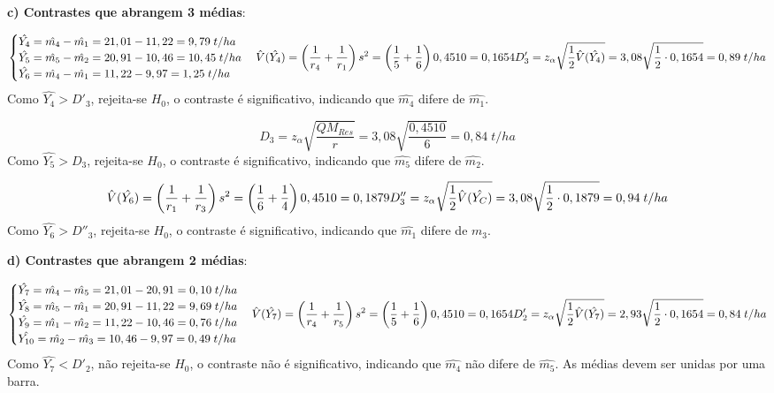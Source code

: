 \documentclass[
]{book}
\begin{document}
\textbf{c) Contrastes que abrangem 3 médias}:

\[
\begin{cases} \hat{Y_4}=\hat{m_4}-\hat{m_1} = 21,01-11,22 = 9,79\;t/ha \\
\hat{Y_5}=\hat{m_5}-\hat{m_2} = 20,91-10,46 = 10,45\;t/ha \\
\hat{Y_6}=\hat{m_4}-\hat{m_1} = 11,22-9,97 = 1,25\;t/ha \end{cases} \\
\hat{V}(\hat{Y_4})= \left( \frac{1}{r_4} + \frac{1}{r_1}\right)s^2 = \left( \frac{1}{5} + \frac{1}{6}\right)0,4510 = 0,1654\\
D'_3 = z_\alpha \sqrt{\frac{1}{2}\hat{V}(\hat{Y_4})}= 3,08\sqrt{\frac{1}{2}\cdot0,1654} = 0,89\; t/ha \\
\]
Como \(\hat{Y_4} > D'_3\), rejeita-se \(H_0\), o contraste é significativo, indicando que \(\hat{m_4}\) difere de \(\hat{m_1}\).

\[
D_3 = z_\alpha \sqrt{\frac{QM_{Res}}{r}} = 3,08 \sqrt{\frac{0,4510}{6}} = 0,84\; t/ha
\]
Como \(\hat{Y_5} > D_3\), rejeita-se \(H_0\), o contraste é significativo, indicando que \(\hat{m_5}\) difere de \(\hat{m_2}\).

\[
\hat{V}(\hat{Y_6})= \left( \frac{1}{r_1} + \frac{1}{r_3}\right)s^2 = \left( \frac{1}{6} + \frac{1}{4}\right)0,4510 = 0,1879\\
D''_3 = z_\alpha \sqrt{\frac{1}{2}\hat{V}(\hat{Y_C})}= 3,08\sqrt{\frac{1}{2}\cdot0,1879} = 0,94\; t/ha \\
\]
Como \(\hat{Y_6} > D''_3\), rejeita-se \(H_0\), o contraste é significativo, indicando que \(\hat{m_1}\) difere de \(\hat{m_3}\).

\textbf{d) Contrastes que abrangem 2 médias}:

\[
\begin{cases} 
\hat{Y_7}=\hat{m_4}-\hat{m_5} = 21,01-20,91 = 0,10\;t/ha \\
\hat{Y_8}=\hat{m_5}-\hat{m_1} = 20,91-11,22 = 9,69\;t/ha \\
\hat{Y_9}=\hat{m_1}-\hat{m_2} = 11,22-10,46 = 0,76\;t/ha \\
\hat{Y_{10}}=\hat{m_2}-\hat{m_3} = 10,46-9,97 = 0,49\;t/ha 
\end{cases} \\
\hat{V}(\hat{Y_7})= \left( \frac{1}{r_4} + \frac{1}{r_5}\right)s^2 = \left( \frac{1}{5} + \frac{1}{6}\right)0,4510 = 0,1654\\
D_2' = z_\alpha \sqrt{\frac{1}{2}\hat{V}(\hat{Y_7})}= 2,93\sqrt{\frac{1}{2}\cdot0,1654} = 0,84\; t/ha \\
\]
Como \(\hat{Y_7} < D'_2\), não rejeita-se \(H_0\), o contraste não é significativo, indicando que \(\hat{m_4}\) não difere de \(\hat{m_5}\). As médias devem ser unidas por uma barra.
\end{document}
